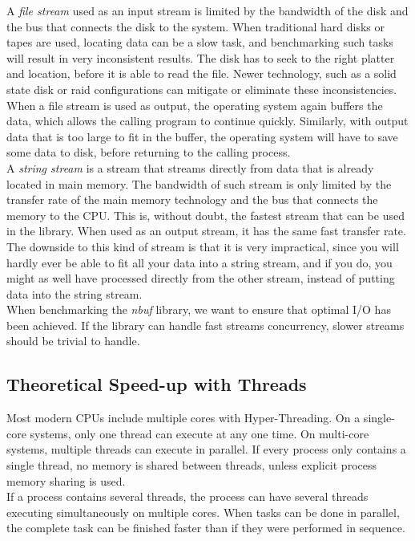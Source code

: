 \documentclass[a4paper]{article}
\newcommand{\nbuf}{\textit{nbuf} }
\begin{document}
A \textit{file stream} used as an input stream is limited by the bandwidth of the disk and the bus that connects the disk to the system. When traditional hard disks or tapes are used, locating data can be a slow task, and benchmarking such tasks will result in very inconsistent results. The disk has to seek to the right platter and location, before it is able to read the file. Newer technology, such as a solid state disk or raid configurations can mitigate or eliminate these inconsistencies. When a file stream is used as output, the operating system again buffers the data, which allows the calling program to continue quickly. Similarly, with output data that is too large to fit in the buffer, the operating system will have to save some data to disk, before returning to the calling process.\\

A \textit{string stream} is a stream that streams directly from data that is already located in main memory. The bandwidth of such stream is only limited by the transfer rate of the main memory technology and the bus that connects the memory to the CPU. This is, without doubt, the fastest stream that can be used in the library. When used as an output stream, it has the same fast transfer rate. The downside to this kind of stream is that it is very impractical, since you will hardly ever be able to fit all your data into a string stream, and if you do, you might as well have processed directly from the other stream, instead of putting data into the string stream.\\

When benchmarking the \nbuf library, we want to ensure that optimal I/O has been achieved. If the library can handle fast streams concurrency, slower streams should be trivial to handle.


\subsection{Theoretical Speed-up with Threads}
Most modern CPUs include multiple cores with Hyper-Threading. On a single-core systems, only one thread can execute at any one time. On multi-core systems, multiple threads can execute in parallel. If every process only contains a single thread, no memory is shared between threads, unless explicit process memory sharing is used.\\

If a process contains several threads, the process can have several threads executing simultaneously on multiple cores. When tasks can be done in parallel, the complete task can be finished faster than if they were performed in sequence.\\
\end{document}
